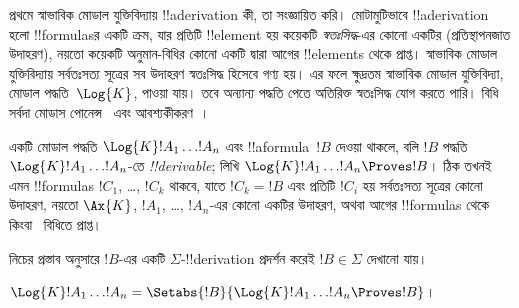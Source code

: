 \documentclass[../../../include/open-logic-section]{subfiles}
\begin{document}


প্রথমে স্বাভাবিক মোডাল যুক্তিবিদ্যায় !!a{derivation} কী, তা সংজ্ঞায়িত করি। মোটামুটিভাবে !!a{derivation} হলো !!{formula}sর একটি ক্রম, যার প্রতিটি !!{element} হয় কয়েকটি \emph{স্বতঃসিদ্ধ}-এর কোনো একটির (প্রতিস্থাপনজাত উদাহরণ), নয়তো কয়েকটি অনুমান-বিধির কোনো একটি দ্বারা আগের !!{element}s থেকে প্রাপ্ত। স্বাভাবিক মোডাল যুক্তিবিদ্যায় সর্বতঃসত্য সূত্রের সব উদাহরণ স্বতঃসিদ্ধ হিসেবে গণ্য হয়। এর ফলে ক্ষুদ্রতম স্বাভাবিক মোডাল যুক্তিবিদ্যা, মোডাল পদ্ধতি~$\Log{K}$, পাওয়া যায়। তবে অন্যান্য পদ্ধতি পেতে অতিরিক্ত স্বতঃসিদ্ধ যোগ করতে পারি। বিধি সর্বদা মোডাস পোনেন্স~\MP{} এবং আবশ্যকীকরণ~\Nec।

\begin{defn}
  একটি মোডাল পদ্ধতি $\Log{K} !A_1 \dots !A_n$ এবং !!a{formula}~$!B$ দেওয়া থাকলে, বলি $!B$ পদ্ধতি $\Log{K} !A_1 \dots
  !A_n$-তে \emph{!!{derivable}}; লিখি $\Log{K} !A_1 \dots !A_n \Proves !B$। ঠিক তখনই এমন !!{formula}s $!C_1$, \dots, $!C_k$ থাকবে, যাতে $!C_k = !B$ এবং প্রতিটি $!C_i$ হয় সর্বতঃসত্য সূত্রের কোনো উদাহরণ, নয়তো $\Ax{K}$, $!A_1$, \dots, $!A_n$-এর কোনো একটির উদাহরণ, অথবা আগের !!{formula}s থেকে \MP{} কিংবা~\Nec{} বিধিতে প্রাপ্ত।
\end{defn}

নিচের প্রস্তাব অনুসারে $!B$-এর একটি $\Sigma$-!!{derivation} প্রদর্শন করেই $!B \in \Sigma$ দেখানো যায়।

\begin{prop}
  $\Log{K} !A_1 \dots !A_n = \Setabs{!B}{\Log{K} !A_1 \dots !A_n \Proves !B}$।
\end{prop}
\end{document}
